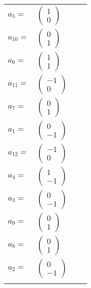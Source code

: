 \documentclass[1p]{elsarticle_modified}
\theoremstyle{definition}
\begin{document}
\begin{tabular}{m{7pt} m{180pt} m{7pt} m{180pt} }
\flushright $a_{5}=$&$\begin{pmatrix}1\\0\end{pmatrix}$ \\
\flushright $a_{10}=$&$\begin{pmatrix}0\\1\end{pmatrix}$ \\
\flushright $a_{6}=$&$\begin{pmatrix}1\\1\end{pmatrix}$ \\
\flushright $a_{11}=$&$\begin{pmatrix}-1\\0\end{pmatrix}$ \\
\flushright $a_{7}=$&$\begin{pmatrix}0\\1\end{pmatrix}$ \\
\flushright $a_{1}=$&$\begin{pmatrix}0\\-1\end{pmatrix}$ \\
\flushright $a_{12}=$&$\begin{pmatrix}-1\\0\end{pmatrix}$ \\
\flushright $a_{4}=$&$\begin{pmatrix}1\\-1\end{pmatrix}$ \\
\flushright $a_{3}=$&$\begin{pmatrix}0\\-1\end{pmatrix}$ \\
\flushright $a_{9}=$&$\begin{pmatrix}0\\1\end{pmatrix}$ \\
\flushright $a_{8}=$&$\begin{pmatrix}0\\1\end{pmatrix}$ \\
\flushright $a_{2}=$&$\begin{pmatrix}0\\-1\end{pmatrix}$\\&\end{tabular}
\end{document}
